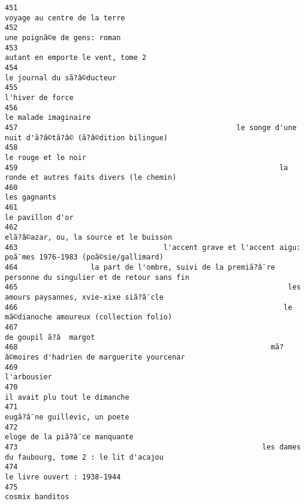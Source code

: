 \documentclass[
]{report}
\begin{document}
\begin{verbatim}
451                                                                            voyage au centre de la terre
452                                                                             une poignã©e de gens: roman
453                                                                       autant en emporte le vent, tome 2
454                                                                              le journal du sã?â©ducteur
455                                                                                        l'hiver de force
456                                                                                    le malade imaginaire
457                                                   le songe d'une nuit d'ã?â©tã?â© (ã?â©dition bilingue)
458                                                                                     le rouge et le noir
459                                                             la ronde et autres faits divers (le chemin)
460                                                                                            les gagnants
461                                                                                        le pavillon d'or
462                                                                 elã?â©azar, ou, la source et le buisson
463                                  l'accent grave et l'accent aigu: poã¨mes 1976-1983 (poã©sie/gallimard)
464                 la part de l'ombre, suivi de la premiã?â¨re personne du singulier et de retour sans fin
465                                                               les amours paysannes, xvie-xixe siã?â¨cle
466                                                              le mã©dianoche amoureux (collection folio)
467                                                                                   de goupil ã?â  margot
468                                                           mã?â©moires d'hadrien de marguerite yourcenar
469                                                                                             l'arbousier
470                                                                           il avait plu tout le dimanche
471                                                                           eugã?â¨ne guillevic, un poete
472                                                                          eloge de la piã?â¨ce manquante
473                                                         les dames du faubourg, tome 2 : le lit d'acajou
474                                                                             le livre ouvert : 1938-1944
475                                                                                         cosmix banditos

\end{verbatim}
\end{document}
